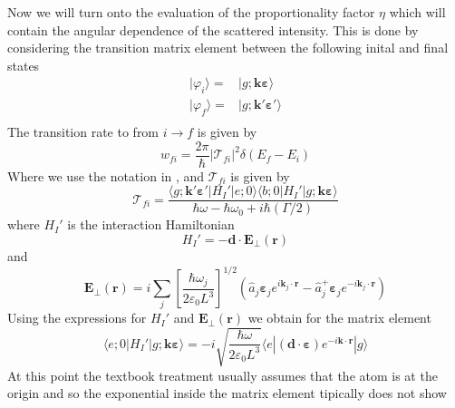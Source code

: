 \documentclass[11pt,letter]{article}
\newcommand{\bv}[1]{\ensuremath{\bm{#1}}}
\begin{document}
Now we will turn onto the evaluation of the proportionality factor $\eta$ which
will contain the angular dependence of the scattered intensity. This is done by considering the  
transition
matrix element between the following inital and final states \begin{equation}
\begin{split}
    | \varphi_{i} \rangle = & | g ; \bv{k}\bv{\varepsilon} \rangle \\
    | \varphi_{f} \rangle = & | g ; \bv{k}'\bv{\varepsilon}' \rangle \\
\end{split}
\end{equation} 
The transition rate to from $i\rightarrow f$ is given by 
\begin{equation}
    \label{eq:transitionRate}
    w_{fi} = \frac{2\pi}{\hbar} | \mathcal{T}_{fi} |^{2} \delta(E_{f}-E_{i})
\end{equation}
Where we use the notation in \cite{cohen1998atom}, and $\mathcal{T}_{fi}$ is given by
\begin{equation}
    \mathcal{T}_{fi} = \frac{  
        \langle g; \bv{k}'\bv{\varepsilon}'| H_{I}' | e; 0 \rangle 
        \langle b; 0 | H_{I}' | g; \bv{k}\bv{\varepsilon} \rangle }
        { \hbar\omega - \hbar\omega_{0} + i\hbar (\Gamma/2 ) }
\end{equation} 
where $H_{I}'$ is the interaction Hamiltonian
\begin{equation}
    H_{I}' = -\bv{d} \cdot \bv{E}_{\perp} ( \bv{r} ) 
\end{equation}
and
\begin{equation}
    \bv{E}_{\perp}(\bv{r}) = i \sum_{j} 
        \left[ \frac{ \hbar \omega_{j} }{ 2\varepsilon_{0} L^{3}}  \right]^{1/2}
        \left( \hat{a}_{j}\bv{\varepsilon}_{j} e^{i\bv{k}_{j}\cdot\bv{r}} 
              - \hat{a}_{j}^{+}\bv{\varepsilon}_{j} e^{-i\bv{k}_{j}\cdot\bv{r}} 
        \right)
\end{equation}
Using the expressions for $H_{I}'$ and $\bv{E}_{\perp}(\bv{r})$ we obtain for the matrix element 
\begin{equation}
   \langle e; 0 | H_{I}' | g; \bv{k}\bv{\varepsilon} \rangle = 
       -i \sqrt{ \frac{ \hbar \omega }{2 \varepsilon_{0} L^{3} }} 
      \langle e | (\bv{d} \cdot \bv{\varepsilon} ) e^{-i\bv{k}\cdot\bv{r}}| g \rangle
\end{equation}
At this point the textbook treatment usually assumes that the atom is at the
origin and so the exponential inside the matrix element tipically does not show
\end{document}
